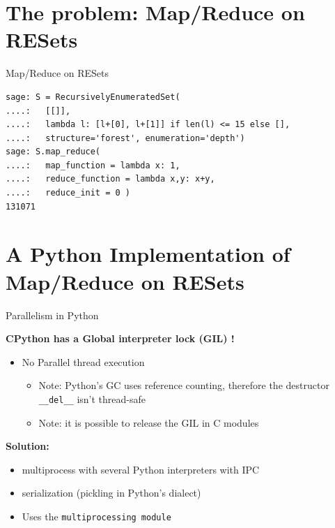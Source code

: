 \documentclass[compress,11pt]{beamer}
\begin{document}
\section{The problem: Map/Reduce on RESets}

\begin{frame}[fragile]{Map/Reduce on RESets}

\begin{verbatim}
sage: S = RecursivelyEnumeratedSet(
....:   [[]],
....:   lambda l: [l+[0], l+[1]] if len(l) <= 15 else [],
....:   structure='forest', enumeration='depth')
sage: S.map_reduce(
....:   map_function = lambda x: 1,
....:   reduce_function = lambda x,y: x+y,
....:   reduce_init = 0 )
131071
\end{verbatim}
\end{frame}



\section{A Python Implementation of Map/Reduce on RESets}

\begin{frame}[fragile]{Parallelism in Python}

\textbf{CPython has a Global interpreter lock (GIL) !}
\bigskip

\begin{itemize}
\item No Parallel thread execution
  \begin{itemize}
  \item Note: Python's GC uses reference counting, therefore the destructor
    \verb+__del__+ isn't thread-safe
  \item Note: it is possible to release the GIL in C modules
  \end{itemize}
\end{itemize}

\pause
\textbf{Solution:}
\begin{itemize}
\item multiprocess with several Python interpreters with IPC
\item serialization (pickling in Python's dialect)
\item Uses the \texttt{multiprocessing module}
\end{itemize}

\end{frame}
\end{document}
